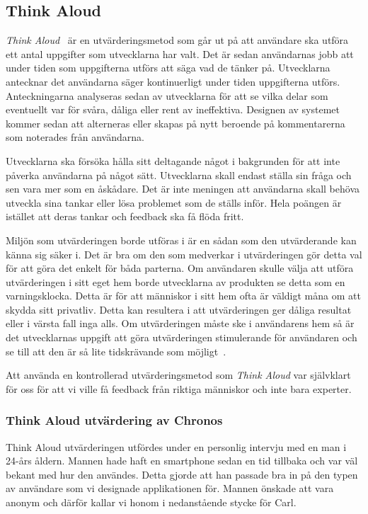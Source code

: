 \documentclass[a4paper, 11pt]{article}
\begin{document}
\subsection{Think Aloud}
\textit{Think Aloud}~\cite[sid 29--32]{thinkaloud} är en utvärderingsmetod som går ut på att användare ska utföra ett antal uppgifter som utvecklarna har valt. Det är sedan användarnas jobb att under tiden som uppgifterna utförs att säga vad de tänker på. Utvecklarna antecknar det användarna säger kontinuerligt under tiden uppgifterna utförs. Anteckningarna analyseras sedan av utvecklarna för att se vilka delar som eventuellt var för svåra, dåliga eller rent av ineffektiva. Designen av systemet kommer sedan att alterneras eller skapas på nytt beroende på kommentarerna som noterades från användarna.


Utvecklarna ska försöka hålla sitt deltagande något i bakgrunden för att inte påverka användarna på något sätt. Utvecklarna skall endast ställa sin fråga och sen vara mer som en åskådare. Det är inte meningen att användarna skall behöva utveckla sina tankar eller lösa problemet som de ställs inför. Hela poängen är istället att deras tankar och feedback ska få flöda fritt.


Miljön som utvärderingen borde utföras i är en sådan som den utvärderande kan känna sig säker i. Det är bra om den som medverkar i utvärderingen gör detta val för att göra det enkelt för båda parterna. Om användaren skulle välja att utföra utvärderingen i sitt eget hem borde utvecklarna av produkten se detta som en varningsklocka. Detta är för att människor i sitt hem ofta är väldigt måna om att skydda sitt privatliv. Detta kan resultera i att utvärderingen ger dåliga resultat eller i värsta fall inga alls. Om utvärderingen måste ske i användarens hem så är det utvecklarnas uppgift att göra utvärderingen stimulerande för användaren och se till att den är så lite tidskrävande som möjligt~\cite[sid 245]{benyon2010designing}.

Att använda en kontrollerad utvärderingsmetod som \textit{Think Aloud} var självklart för oss för att vi ville få feedback från riktiga människor och inte bara experter.

\subsubsection{Think Aloud utvärdering av Chronos}
Think Aloud utvärderingen utfördes under en personlig intervju med en man i 24-års åldern. Mannen hade haft en smartphone sedan en tid tillbaka och var väl bekant med hur den användes. Detta gjorde att han passade bra in på den typen av användare som vi designade applikationen för. Mannen önskade att vara anonym och därför kallar vi honom i nedanstående stycke för Carl.
\end{document}
